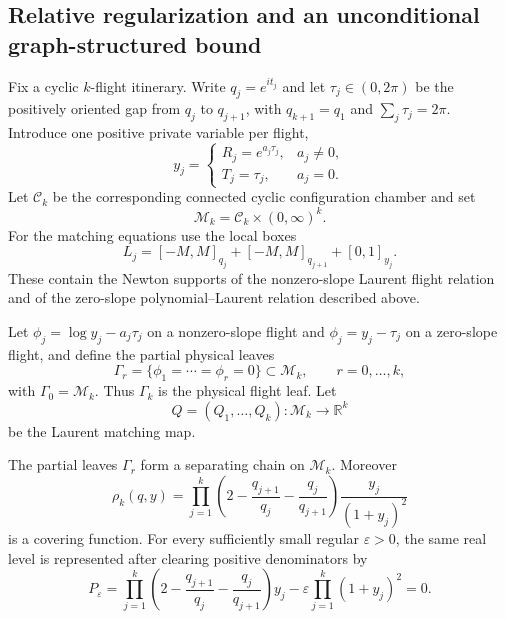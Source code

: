 
\subsection{Relative regularization and an unconditional graph-structured bound}
\label{subsec:relative-graph-bound}

Fix a cyclic $k$-flight itinerary.  Write $q_j=e^{it_j}$ and let
$\tau_j\in(0,2\pi)$ be the positively oriented gap from $q_j$ to $q_{j+1}$,
with $q_{k+1}=q_1$ and $\sum_j\tau_j=2\pi$.  Introduce one positive private
variable per flight,
\[
 y_j=\begin{cases}
 R_j=e^{a_j\tau_j},&a_j\ne0,\\
 T_j=\tau_j,&a_j=0.
 \end{cases}
\]
Let $\mathcal C_k$ be the corresponding connected cyclic configuration chamber
and set
\[
 \mathcal M_k=\mathcal C_k\times(0,\infty)^k.
\]
For the matching equations use the local boxes
\begin{equation}\label{eq:rg-local-box}
 L_j=[-M,M]_{q_j}+[-M,M]_{q_{j+1}}+[0,1]_{y_j}.
\end{equation}
These contain the Newton supports of the nonzero-slope Laurent flight relation
and of the zero-slope polynomial--Laurent relation described above.

Let $\phi_j=\log y_j-a_j\tau_j$ on a nonzero-slope flight and
$\phi_j=y_j-\tau_j$ on a zero-slope flight, and define the partial physical
leaves
\begin{equation}\label{eq:rg-Gamma-r}
 \Gamma_r=\{\phi_1=\cdots=\phi_r=0\}\subset\mathcal M_k,
 \qquad r=0,\ldots,k,
\end{equation}
with $\Gamma_0=\mathcal M_k$.  Thus $\Gamma_k$ is the physical flight leaf.
Let
\[
 Q=(Q_1,\ldots,Q_k):\mathcal M_k\longrightarrow\mathbb R^k
\]
be the Laurent matching map.

\begin{lemma}
\label{lem:rg-covering}
The partial leaves \(\Gamma_r\) form a separating chain on \(\mathcal M_k\).
Moreover
\begin{equation}\label{eq:rg-rho}
 \rho_k(q,y)=\prod_{j=1}^k
 \left(2-\frac{q_{j+1}}{q_j}-\frac{q_j}{q_{j+1}}\right)
 \frac{y_j}{(1+y_j)^2}
\end{equation}
is a covering function.  For every sufficiently small regular
\(\varepsilon>0\), the same real level is represented after clearing positive
denominators by
\begin{equation}\label{eq:rg-Peps}
 P_\varepsilon=
 \prod_{j=1}^k
 \left(2-\frac{q_{j+1}}{q_j}-\frac{q_j}{q_{j+1}}\right)y_j
 -\varepsilon\prod_{j=1}^k(1+y_j)^2=0.
\end{equation}
\end{lemma}

